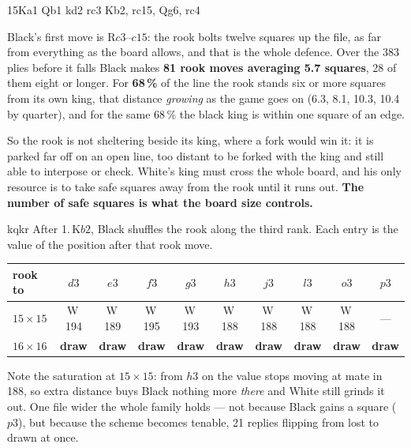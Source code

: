 \documentclass[10pt]{article}
\begin{document}
\medskip
\noindent
\begin{minipage}[t]{0.40\textwidth}
\begin{stepboard}[width=\linewidth,board=3.66cm,height=52mm,coords=false,
  intro={$15\times15$, White to move --- mate in 197}]{15}{Ka1 Qb1 kd2 rc3}
  Kb2, rc15, Qg6, rc4
\end{stepboard}
\end{minipage}\hfill
\begin{minipage}[t]{0.56\textwidth}\vspace{0pt}\small
Black's first move is R$c3$--$c15$: the rook bolts twelve squares up the file,
as far from everything as the board allows, and that is the whole defence. Over
the 383 plies before it falls Black makes \textbf{81 rook moves averaging 5.7
squares}, 28 of them eight or longer. For \textbf{68\,\%} of the line the rook
stands six or more squares from its own king, that distance \emph{growing} as
the game goes on (6.3, 8.1, 10.3, 10.4 by quarter), and for the same $68\,\%$
the black king is within one square of an edge.

\smallskip
So the rook is not sheltering beside its king, where a fork would win it: it is
parked far off on an open line, too distant to be forked with the king and
still able to interpose or check. White's king must cross the whole board, and
his only resource is to take safe squares away from the rook until it runs out.
\textbf{The number of safe squares is what the board size controls.}
\end{minipage}

\begin{result}[title={The same rook moves: every one loses at 15, every one draws at 16}]{kqkr}
After 1.\,K$b2$, Black shuffles the rook along the third rank. Each entry is
the value of the position after that rook move.

\begin{center}\small
\begin{tabular}{@{}lccccccccc@{}}
\toprule
rook to & $d3$ & $e3$ & $f3$ & $g3$ & $h3$ & $j3$ & $l3$ & $o3$ & $p3$ \\
\midrule
$15\times15$ & W\,194 & W\,189 & W\,195 & W\,193 & W\,188 & W\,188 & W\,188 &
  W\,188 & --- \\
$16\times16$ & \textbf{draw} & \textbf{draw} & \textbf{draw} & \textbf{draw} &
  \textbf{draw} & \textbf{draw} & \textbf{draw} & \textbf{draw} &
  \textbf{draw} \\
\bottomrule
\end{tabular}
\end{center}

\smallskip
Note the saturation at $15\times15$: from $h3$ on the value stops moving at
mate in 188, so extra distance buys Black nothing more \emph{there} and White
still grinds it out. One file wider the whole family holds --- not because
Black gains a square ($p3$), but because the scheme becomes tenable, 21 replies
flipping from lost to drawn at once.
\end{result}
\end{document}
